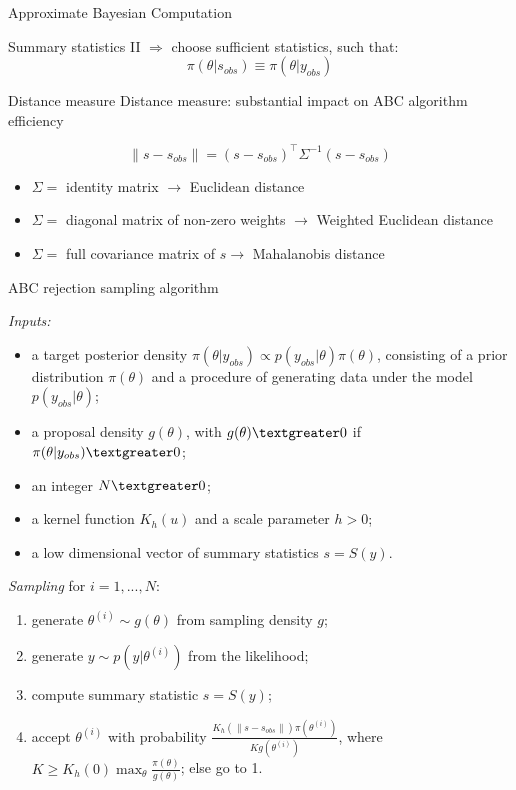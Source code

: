 \documentclass{beamer}
\begin{document}
\begin{section}{Approximate Bayesian Computation}
\begin{frame}{Summary statistics II}
		\vspace{0.3cm}
		$\Longrightarrow$ choose sufficient statistics, such that:
		\[   \pi(\theta|s_{obs}) \equiv \pi(\theta|y_{obs})   \]

	\end{frame}

	\begin{frame}{Distance measure}
		Distance measure: substantial impact on ABC algorithm efficiency
		
		\[  \parallel s - s_{obs} \parallel = (s - s_{obs})^\top \Sigma^{-1} (s - s_{obs}) \]
		
		\pause
		\vspace{1cm}
		\begin{itemize}
			\item $\Sigma = $ identity matrix $ \rightarrow$ Euclidean distance 
			\item $\Sigma =$ diagonal matrix of non-zero weights $ \rightarrow$ Weighted Euclidean distance 
			\item $\Sigma = $ full covariance matrix of $s \rightarrow$ Mahalanobis distance 
		\end{itemize}
	\end{frame}

	\begin{frame}{ABC rejection sampling algorithm}

		 {
			\emph{Inputs:}
			\begin{itemize}
				\item a target posterior density $\pi(\theta | y_{obs}) \propto p(y_{obs}|\theta) \pi(\theta)$, consisting of a prior distribution $\pi(\theta)$ and a procedure of generating data under the model $p(y_{obs}|\theta)$;
				\item a proposal density $g(\theta)$, with $g(\theta)\textgreater 0 $ if $\pi(\theta | y_{obs}) \textgreater 0$;
				\item an integer $N \textgreater0$;
				\item a kernel function $K_h(u)$ and a scale parameter $h > 0$;
				\item a low dimensional vector of summary statistics $s=S(y)$.
			\end{itemize}
		}
		\only<2> {
			\emph{Sampling} for $i= 1,..., N$:
			\begin{enumerate}
				\item generate $\theta ^ {(i)} \sim g(\theta)$ from sampling density $g$;
				\item generate $ y \sim p(y|\theta ^ {(i)})$ from the likelihood;
				\item compute summary statistic $s = S(y)$;
				\item accept $\theta ^ {(i)}$ with probability $\frac{K_h(\parallel s-s_{obs}\parallel)   \pi(\theta ^ {(i)})}{K g(\theta ^ {(i)})}$, where $K \geq K_h(0)\max_{\theta}{\frac{\pi(\theta)}{g(\theta)}}$; else go to 1.
			\end{enumerate}
		
}
\end{frame}
\end{section}
\end{document}

